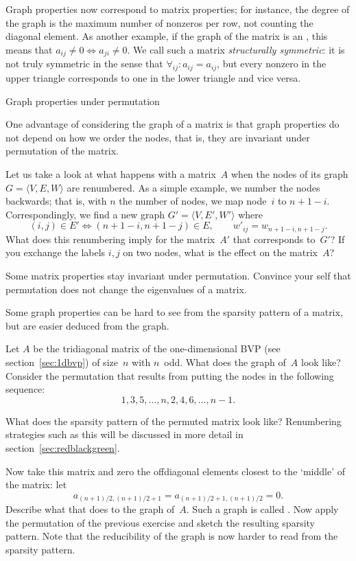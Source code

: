 Graph properties now correspond to matrix properties; for instance,
the degree of the graph is the maximum number of nonzeros per row, not
counting the diagonal element. As another example, if the graph of the
matrix is an , this means that
$a_{ij}\not=0\Leftrightarrow a_{ji}\not=0$. We call such a matrix
\emph{structurally symmetric}:
it is not truly symmetric in the
sense that $\forall_{ij}\colon a_{ij}=a_{ij}$, but every nonzero in
the upper triangle corresponds to one in the lower triangle and vice versa.

 {Graph properties under permutation}

One advantage of considering the graph of a matrix is that graph properties
do not depend on how we order the nodes, that is, they are invariant
under permutation of the matrix.

\begin{exercise}
  Let us take a look at what happens with a matrix~$A$ when the nodes
  of its graph $G=\langle V,E,W\rangle$ are renumbered. As a simple example,
  we number the nodes backwards; that is, with $n$ the number of
  nodes, we map node~$i$ to $n+1-i$.
  Correspondingly, we find a new graph
  $G'=\langle V,E',W'\rangle$ where
  \[ (i,j)\in E'\Leftrightarrow (n+1-i,n+1-j)\in E,\qquad
  w'_{ij}=w_{n+1-i,n+1-j}.\]
  What does this renumbering imply for the matrix~$A'$ that
  corresponds to~$G'$? If you exchange the labels $i,j$ on two nodes,
  what is the effect on the matrix~$A$?
\end{exercise}

\begin{exercise}
  Some matrix properties stay invariant under permutation. Convince
  your self that permutation does not change the eigenvalues of a matrix.
\end{exercise}

Some graph properties can be hard to see from the sparsity pattern of
a matrix, but are easier deduced from the graph.

\begin{exercise}
  \label{ex:rb-tridiagonal}
  Let $A$ be the tridiagonal matrix of the one-dimensional \ac{BVP}
  (see section~\ref{sec:1dbvp}) of size~$n$ with $n$~odd. What does
  the graph of~$A$ look like?  Consider the permutation that results
  from putting the nodes in the following sequence:
  \[ 1,3,5,\ldots,n,2,4,6,\ldots, n-1. \]

  What does the sparsity pattern of the permuted matrix look like?
  Renumbering strategies such as this will be discussed in more detail
  in section~\ref{sec:redblackgreen}.

  \label{ex:reducible-tridiagonal}
  Now take this matrix and zero the
  offdiagonal elements closest to the `middle' of the matrix: let
  \[ a_{(n+1)/2,(n+1)/2+1}=a_{(n+1)/2+1,(n+1)/2}=0. \]
  Describe what that
  does to the graph of~$A$. Such a graph is called
  . Now apply the permutation of the previous
  exercise and sketch the resulting sparsity pattern. Note that the
  reducibility of the graph is now harder to read from the sparsity
  pattern.
\end{exercise}

